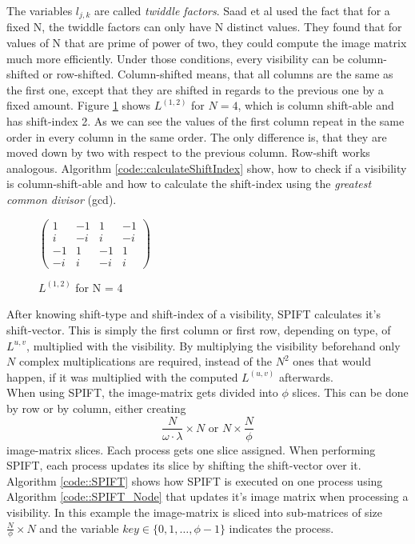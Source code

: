 \documentclass[12pt]{article}
\begin{document}
The variables $l_{j,k}$ are called \emph{twiddle factors}. Saad et al used the fact that for a fixed N, the twiddle factors can only have N distinct values. They found that for values of N that are prime of power of two, they could compute the image matrix much more efficiently.
Under those conditions, every visibility can be column-shifted or row-shifted. Column-shifted means, that all columns are the same as the first one, except that they are shifted in regards to the previous one by a fixed amount. Figure \ref{matrix::column_shift_example} shows $L^{(1,2)}$ for $N=4$, which is column shift-able and has shift-index 2. As we can see the values of the first column repeat in the same order in every column in the same order. The only difference is, that they are moved down by two with respect to the previous column. Row-shift works analogous. Algorithm \ref{code::calculateShiftIndex} show, how to check if a visibility is column-shift-able and how to calculate the shift-index using the \emph{greatest common divisor} (gcd).

\begin{figure} [H]
	\begin{center}
		$
		\begin{pmatrix}
		1 & -1 & 1 & -1\\
		i & -i & i & -i\\
		-1&  1 & -1&  1\\
		-i&  i & -i&  i
		\end{pmatrix}
		$
		\caption{$L^{(1,2)}$ for N = 4}\label{euclid}
		\label{matrix::column_shift_example}
	\end{center}
\end{figure}

After knowing shift-type and shift-index of a visibility, SPIFT calculates it's shift-vector. This is simply the first column or first row, depending on type, of $L^{u,v}$, multiplied with the visibility. By multiplying the visibility beforehand only $N$ complex multiplications are required, instead of the $N^2$ ones that would happen, if it was multiplied with the computed $L^{(u,v)}$ afterwards.\\

When using SPIFT, the image-matrix gets divided into $\phi$ slices. This can be done by row or by column, either creating
\[
\frac{N}{\omega\cdot \lambda}\times{N}\textrm{ or }N\times\frac{N}{\phi}
\] image-matrix slices. Each process gets one slice assigned. When performing SPIFT, each process updates its slice by shifting the shift-vector over it. Algorithm \ref{code::SPIFT} shows how SPIFT is executed on one process using Algorithm \ref{code::SPIFT_Node} that updates it's image matrix when processing a visibility. In this example the image-matrix is sliced into sub-matrices of size $\frac{N}{\phi}\times N$ and the variable $key \in \{0,1,\ldots,\phi-1\}$ indicates the process.
\\
\end{document}
